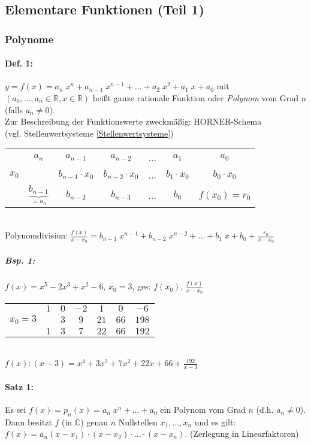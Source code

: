 \subsection{Elementare Funktionen (Teil 1)} \label{1.4.1}
\subsubsection{Polynome}
\paragraph{Def. 1:} \parskp
$y=f(x)=a_n\; x^n+a_{n-1}\;x^{n-1}+...+a_2\; x^2+a_1\; x+a_0$ mit $(a_0, ..., a_n \in \mathbb{R}, x\in \mathbb{R})$ heißt ganze rationale Funktion oder \emph{Polynom} vom Grad $n$ (falls $a_n \not = 0$).\\
Zur Beschreibung der Funktionswerte zweckmäßig: HORNER-Schema\\
(vgl. Stellenwertsysteme  \ref{Stellenwertsysteme})\\
\begin{tabular}{r | c c c c c c}
 & $a_n$ & $a_{n-1}$ & $ a_{n-2}$ & ... & $a_1$ & $a_0$\\
$x_0$ &  & $b_{n-1}\cdot x_0$ & $b_{n-2}\cdot x_0$ & ... & $b_1 \cdot x_0$ & $b_0\cdot x_0$ \\
\hline
 & $\underbrace{\boxed{b_{n-1}}}_{=a_n}$ & $\boxed{b_{n-2}}$ & $\boxed{b_{n-3}}$ & ... & $\boxed{b_0}$ & $f(x_0)=r_0$\\
\end{tabular}\\
Polynomdivision: $\frac{f(x)}{x-x_0}=b_{n-1}\;x^{n-1}+b_{n-2}\;x^{n-2}+...+b_1\; x + b_0 + \frac{r_0}{x-x_0}$

\subparagraph{Bsp. 1:} \parskp
$f(x)=x^5-2x^3+x^2-6$, \quad $x_0=3$, \quad ges: $f(x_0)$, \quad$\frac{f(x)}{x-x_0}$\\
\begin{tabular}{r| c c c c c c}
 & $1$ & $0$ & $-2$ & $1$ & $0$ & $-6$\\
$x_0=3$ &  & $3$ & $9$ & $21$ & $66$ & $198$ \\
\hline
 & $1$ & $3$ & $7$ & $22$ & $66$ & $192$\\
\end{tabular}\\
$f(x):(x-3)=x^4+3 x^3 + 7x^2+22x + 66 + \frac{192}{x-3}$

\paragraph{Satz 1:} \parskp
Es sei $f(x)=p_n(x) = a_n \; x^n + ... + a_0$ ein Polynom vom Grad $n$ (d.h. $a_n\not = 0$). Dann besitzt $f$ (in $\mathbb{C}$) genau $n$ Nullstellen $x_1,...,x_n$ und es gilt: $f(x) = a_n (x-x_1)\cdot (x-x_2)\cdot ... \cdot (x-x_n)$. (Zerlegung in Linearfaktoren)

